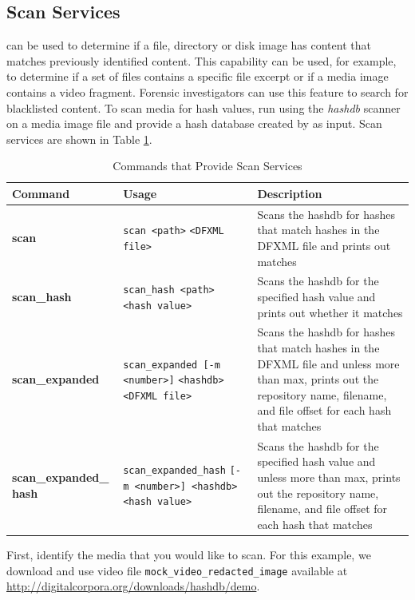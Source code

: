 \documentclass[11pt,fleqn]{article} %
\begin{document}
\subsection{Scan Services}
\label{ScanServices}
\hash can be used to determine if a file, directory or disk image has content that matches previously identified content. This capability can be used, for example, to determine if a set of files contains a specific file excerpt or if a media image contains a video fragment. Forensic investigators can use this feature to search for blacklisted content. To scan media for hash values, run using the \bulk \textit{hashdb} scanner on a media image file and provide a hash database created by \hash as input.
Scan services are shown in Table \ref{tab:scanServices}. \\

\begin{table}[!ht]
\centering
\caption{Commands that Provide Scan Services}
\label{tab:scanServices}
\begin{tabular}{|p{3.5 cm}|p{6 cm}|p{4 cm}|}
\hline \hline
\textbf{Command} & \textbf{Usage} & \textbf{Description} \\
\hline
\textbf{scan} & \verb+scan <path>+ \verb+<DFXML file>+ & Scans the hashdb for hashes that match hashes in the DFXML file and prints out matches\\
\hline
\textbf{scan\_hash} & \verb+scan_hash <path>+ \verb+<hash value>+ & Scans the hashdb for the specified hash value and prints out whether it matches\\
\hline
\textbf{scan\_expanded} & \verb+scan_expanded [-m <number>]+ \verb+<hashdb> <DFXML file>+ & Scans the hashdb for hashes that match hashes in the DFXML file and unless more than max, prints out the repository name, filename, and file offset for each hash that matches\\
\hline
\textbf{scan\_expanded\_} \textbf{hash} & \verb+scan_expanded_hash+ \verb+[-m <number>] <hashdb>+ \verb+<hash value>+ & Scans the hashdb for the specified hash value and unless more than max, prints out the repository name, filename, and file offset for each hash that matches\\
\hline
\end{tabular}
\end{table}

First, identify the media that you would like to scan. For this example, we download and use video file \texttt{mock\_video\_redacted\_image} available at \url{http://digitalcorpora.org/downloads/hashdb/demo}.\\ 
\end{document}
